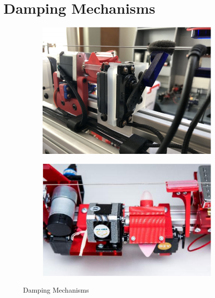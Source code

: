 \documentclass[12pt, a4paper, onecolumn]{IEEEtran}
\begin{document}
    \section{Damping Mechanisms}
        \begin{figure}[!h]
            \centering
            \begin{subfigure}{0.35\textwidth}
                \includegraphics[width=\columnwidth]{mechbass_damping.png}
                \label{fig:mechbass_damping}
            \end{subfigure}
            \begin{subfigure}{0.4\textwidth}
                \includegraphics[width=\columnwidth]{silicone_damping.png}
                \label{fig:pwm_picking}
            \end{subfigure}
            \caption{Damping Mechanisms}
            \label{fig:silicone_damping}
        \end{figure}
\end{document}
